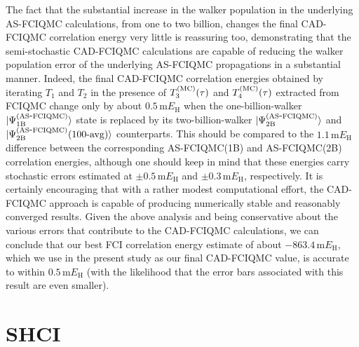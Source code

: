 \documentclass[journal=jcp,manuscript=suppinfo]{achemso}
\begin{document}
The fact that the substantial increase in the walker population in the
underlying AS-FCIQMC calculations, from one to two billion, changes the final
CAD-FCIQMC correlation energy very little is reassuring too, demonstrating that
the semi-stochastic CAD-FCIQMC calculations are capable of reducing the walker population
error of the underlying AS-FCIQMC propagations in a substantial manner. Indeed,
the final CAD-FCIQMC correlation energies obtained by iterating $T_{1}$ and $T_{2}$
in the presence of $T_{3}^{\rm (MC)}(\tau)$ and $T_{4}^{\rm (MC)}(\tau)$ extracted from FCIQMC
change only by about $0.5 \, \text{m}E_{\text{H}}$ when the one-billion-walker
$|\Psi_{\rm 1B}^{\rm (AS\mbox{-}FCIQMC)}\rangle$ state is replaced by its
two-billion-walker $|\Psi_{\rm 2B}^{\rm (AS\mbox{-}FCIQMC)}\rangle$ and
$|\Psi_{\rm 2B}^{\rm (AS\mbox{-}FCIQMC)}\mbox{(100-avg)}\rangle$ counterparts.
This should be compared to the $1.1 \, \text{m}E_{\text{H}}$ difference between
the corresponding AS-FCIQMC(1B) and AS-FCIQMC(2B) correlation energies, although
one should keep in mind that these energies carry stochastic errors estimated at
$\pm 0.5 \, \text{m}E_{\text{H}}$ and $\pm 0.3 \, \text{m}E_{\text{H}}$, respectively.
It is certainly encouraging that with a rather modest computational effort, the
CAD-FCIQMC approach is capable of producing numerically stable and reasonably
converged results. Given the above analysis and being conservative about the
various errors that contribute to the CAD-FCIQMC calculations, we can conclude that our best
FCI correlation energy estimate of about $-863.4 \, \text{m}E_{\text{H}}$,
which we use in the present study as our final CAD-FCIQMC value, is accurate
to within $0.5 \, \text{m}E_{\text{H}}$ (with the likelihood that the error
bars associated with this result are even smaller).


\section{SHCI}
\end{document}
